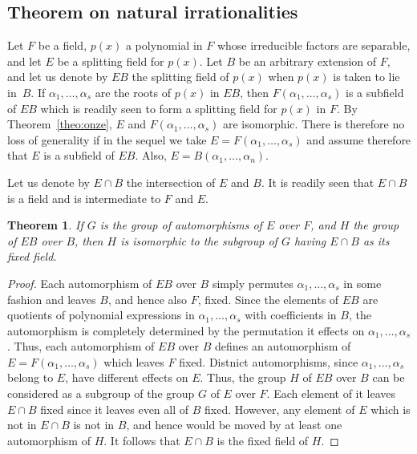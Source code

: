 \documentclass[10pt,leqno]{article}
\newtheorem{theo}{Theorem}
\theoremstyle{definition}
\begin{document}
\subsection{Theorem on natural irrationalities}

Let $F$ be a field, $p(x)$ a polynomial in $F$ whose irreducible factors are separable, and let $E$ be a splitting field for $p(x)$.
Let $B$ be an arbitrary extension of $F$, and let us denote by $EB$ the splitting field of $p(x)$ when $p(x)$ is taken to lie in~$B$.
If $\alpha_1, \ldots, \alpha_s$ are the roots of $p(x)$ in $EB$, then $F(\alpha_1, \ldots, \alpha_s)$ is a subfield of $EB$ which is readily seen to form a splitting field for $p(x)$ in $F$.
By Theorem~\ref{theo:onze}, $E$ and $F(\alpha_1,\ldots,\alpha_s)$ are isomorphic.
There is therefore no loss of generality if in the sequel we take $E = F(\alpha_1,\ldots,\alpha_s)$ and assume therefore that $E$ is a subfield of $EB$.
Also, $E = B(\alpha_1, \ldots, \alpha_n)$.

Let us denote by $E \cap B$ the intersection of $E$ and $B$.
It is readily seen that $E \cap B$ is a field and is intermediate to $F$ and $E$.


\begin{theo}
\label{theo:29}
If $G$ is the group of automorphisms of $E$ over $F$, and $H$ the group of $EB$ over $B$, then $H$ is isomorphic to the subgroup of $G$ having $E \cap B$ as its fixed field.
\end{theo}


\begin{proof}
Each automorphism of $EB$ over $B$ simply permutes $\alpha_1, \ldots, \alpha_s$ in some fashion and leaves $B$, and hence also $F$, fixed.
Since the elements of $EB$ are quotients of polynomial expressions in $\alpha_1, \ldots, \alpha_s$ with coefficients in $B$, the automorphism is completely determined by the permutation it effects on $\alpha_1, \ldots, \alpha_s$.
Thus, each automorphism of $EB$ over $B$ defines an automorphism of $E = F(\alpha_1,\ldots,\alpha_s)$ which leaves $F$ fixed.
Distnict automorphisms, since $\alpha_1, \ldots, \alpha_s$ belong to $E$, have different effects on $E$.
Thus, the group $H$ of $EB$ over $B$ can be considered as a subgroup of the group $G$ of $E$ over $F$.
Each element of it leaves $E \cap B$ fixed since it leaves even all of $B$ fixed.
However, any element of $E$ which is not in $E \cap B$ is not in $B$, and hence would be moved by at least one automorphism of $H$.
It follows that $E \cap B$ is the fixed field of $H$.
\end{proof}
\end{document}
